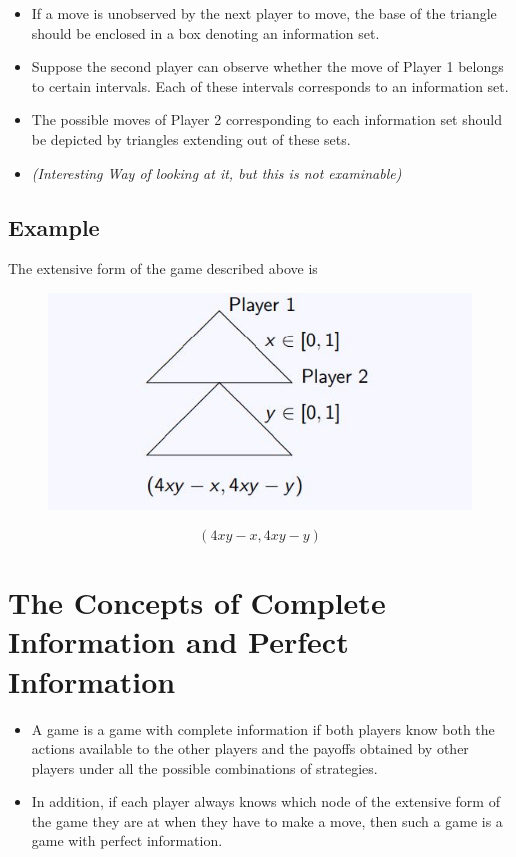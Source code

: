 \documentclass[]{report}
\begin{document}
\begin{itemize}
	\item If a move is unobserved by the next player to move, the base of the
	triangle should be enclosed in a box denoting an information set.
	\item Suppose the second player can observe whether the move of Player
	1 belongs to certain intervals. Each of these intervals corresponds
	to an information set.
	\item  The possible moves of Player 2 corresponding to each information
	set should be depicted by triangles extending out of these sets. 
\item \textit{(Interesting Way of looking at it, but this is not examinable)}
\end{itemize}

\subsection{Example}
The extensive form of the game described above is

\begin{figure}
\centering
\includegraphics[width=0.55\linewidth]{images/DR5-Slide31}
\caption{}
\label{fig:DR5-Slide31}
\end{figure}

\[(4xy − x, 4xy − y)\]
\section{The Concepts of Complete Information and Perfect
	Information}
\begin{itemize}
	\item A game is a game with complete information if both players
	know both the actions available to the other players and the
	payoffs obtained by other players under all the possible
	combinations of strategies.
\item 	In addition, if each player always knows which node of the
	extensive form of the game they are at when they have to make
	a move, then such a game is a game with perfect information.
\end{itemize}
\end{document}
